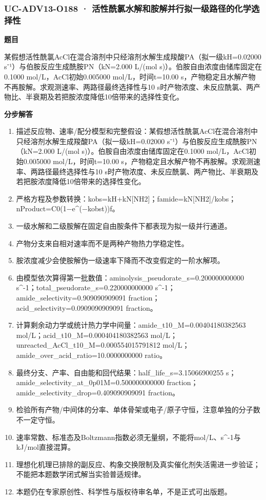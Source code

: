 \documentclass[UTF8,11pt,a4paper]{ctexart}
\begin{document}
\subsubsection*{UC-ADV13-O188 · 活性酰氯水解和胺解并行拟一级路径的化学选择性}
\noindent\textbf{题目}\par
某假想活性酰氯AcCl在混合溶剂中只经溶剂水解生成羧酸PA（拟一级kH=0.02000 s⁻¹）与伯胺反应生成酰胺PN（kN=2.000 L/(mol s)）。伯胺自由浓度由储库固定在0.1000 mol/L，AcCl初始0.005000 mol/L，时间t=10.00 s，产物稳定且水解产物不再胺解。求观测速率、两路径最终选择性与10 s时产物浓度、未反应酰氯、两产物比、半衰期及若把胺浓度降低10倍带来的选择性变化。\par
\medskip\noindent\textbf{分步解答}
\begin{enumerate}
\item 描述反应物、速率/配分模型和完整假设：某假想活性酰氯AcCl在混合溶剂中只经溶剂水解生成羧酸PA（拟一级kH=0.02000 s⁻¹）与伯胺反应生成酰胺PN（kN=2.000 L/(mol s)）。伯胺自由浓度由储库固定在0.1000 mol/L，AcCl初始0.005000 mol/L，时间t=10.00 s，产物稳定且水解产物不再胺解。求观测速率、两路径最终选择性与10 s时产物浓度、未反应酰氯、两产物比、半衰期及若把胺浓度降低10倍带来的选择性变化。
\item 严格方程及参数转换：kobs=kH+kN[NH2]；famide=kN[NH2]/kobs；nProduct=C0(1−e\textasciicircum{}(−kobst))f。
\item 一级水解和二级胺解在固定自由胺条件下都表现为拟一级并行通道。
\item 产物分支来自相对速率而不是两种产物热力学稳定性。
\item 胺浓度减少会使胺解伪一级速率下降而不改变假定的一阶水解项。
\item 由模型依次算得第一批数值：aminolysis\_pseudorate\_s=0.200000000000 s\textasciicircum{}-1；total\_pseudorate\_s=0.220000000000 s\textasciicircum{}-1；amide\_selectivity=0.909090909091 fraction；acid\_selectivity=0.0909090909091 fraction。
\item 计算剩余动力学或统计热力学中间量：amide\_t10\_M=0.00404180382563 mol/L；acid\_t10\_M=0.000404180382563 mol/L；unreacted\_AcCl\_t10\_M=0.000554015791812 mol/L；amide\_over\_acid\_ratio=10.0000000000 ratio。
\item 最终分支、产率、自由能和回代结果：half\_life\_s=3.15066900255 s；amide\_selectivity\_at\_0p01M=0.500000000000 fraction；amide\_selectivity\_drop=0.409090909091 fraction。
\item 检验所有产物/中间体的分率、单体骨架或电子/原子守恒，注意单独的分子数不一定守恒。
\item 速率常数、标准态及Boltzmann指数必须无量纲，不能将mol/L、s\textasciicircum{}-1与kJ/mol直接混算。
\item 理想化机理已排除的副反应、构象交换限制及真实催化剂失活需进一步验证；不能把本题数学闭式解当实验普适规律。
\item 本题仍在专家原创性、科学性与版权待审名单，不是正式可出版题。
\end{enumerate}
\end{document}
